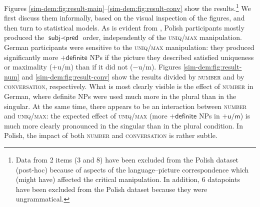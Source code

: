 \documentclass[output=paper]{langscibook}
\begin{document}
Figures \ref{sim-dem:fig:result-main}--\ref{sim-dem:fig:result-conv} show the results.\footnote{Data from 2 items (3 and 8) have been excluded from the Polish dataset (post-hoc) because of aspects of the language--picture correspondence which (might have) affected the critical manipulation. In addition, 6 datapoints have been excluded from the Polish dataset because they were ungrammatical.\label{sim-dem:fn:excluded-items}} We first discuss them informally, based on the visual inspection of the figures, and then turn to statistical models. As is evident from , Polish participants mostly produced the $\textsf{subj}\prec\textsf{pred}$ order, independently of the \textsc{uniq/max} manipulation. German participants were sensitive to the \textsc{uniq/max} manipulation: they produced significantly more $+\textsf{definite}$ NPs if the picture they described satisfied uniqueness or maximality (\textsf{$+$u/m}) than if it did not (\textsf{$-$u/m}). Figures \ref{sim-dem:fig:result-num} and \ref{sim-dem:fig:result-conv} show the results divided by \textsc{number} and by \textsc{conversation}, respectively. What is most clearly visible is the effect of \textsc{number} in German, where definite NPs were used much more in the \textsf{plural} than in the \textsf{singular}. At the same time, there appears to be an interaction between \textsc{number} and \textsc{uniq/max}: the expected effect of \textsc{uniq/max} (more $+\textsf{definite}$ NPs in $+\textsf{u/m}$) is much more clearly pronounced in the \textsf{singular} than in the \textsf{plural} condition. In Polish, the impact of both \textsc{number} and \textsc{conversation} is rather subtle.
\end{document}
